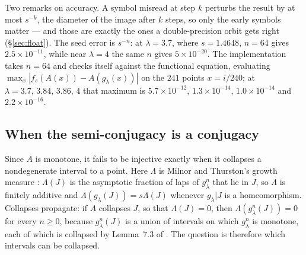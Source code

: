 \documentclass[11pt]{article}
\theoremstyle{plain}
\theoremstyle{definition}
\begin{document}
Two remarks on accuracy.  A symbol misread at step $k$ perturbs the result by at most
$s^{-k}$, the diameter of the image after $k$ steps, so only the early symbols matter --- and
those are exactly the ones a double-precision orbit gets right (\S\ref{sec:float}).  The
seed error is $s^{-n}$: at $\lambda=3.7$, where $s=1.4648$, $n=64$ gives
$2.5\times10^{-11}$, while near $\lambda=4$ the same $n$ gives $5\times10^{-20}$.  The
implementation takes $n=64$ and checks itself against the functional equation, evaluating
$\max_x|f_s(A(x))-A(g_\lambda(x))|$ on the $241$ points $x=i/240$; at
$\lambda=3.7,\,3.84,\,3.86,\,4$ that maximum is $5.7\times10^{-12}$, $1.3\times10^{-14}$,
$1.0\times10^{-14}$ and $2.2\times10^{-16}$.

\subsection{When the semi-conjugacy is a conjugacy}\label{sec:conjugacy}

Since $A$ is monotone, it fails to be injective exactly when it collapses a nondegenerate
interval to a point.  Here $\Lambda$ is Milnor and Thurston's growth measure
\cite[\S7]{MT}: $\Lambda(J)$ is the asymptotic fraction of laps of $g_\lambda^n$ that lie in
$J$, so $\Lambda$ is finitely additive and $\Lambda(g_\lambda(J))=s\Lambda(J)$ whenever
$g_\lambda|J$ is a homeomorphism.  Collapses propagate: if $A$ collapses $J$, so that
$\Lambda(J)=0$, then
$\Lambda(g_\lambda^n(J))=0$ for every $n\ge0$, because $g_\lambda^n(J)$ is a union of intervals
on which $g_\lambda^n$ is monotone, each of which is collapsed by Lemma~7.3 of \cite{MT}.  The
question is therefore which intervals can be collapsed.
\end{document}
